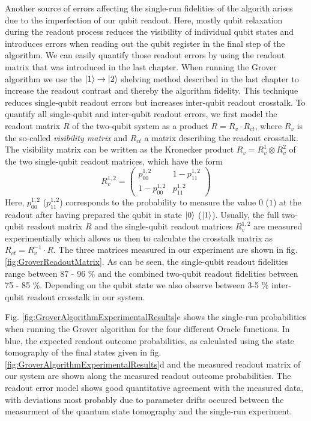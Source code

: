 Another source of errors affecting the single-run fidelities of the algorith arises due to the imperfection of our qubit readout. Here, mostly qubit relaxation during the readout process reduces the visibility of individual qubit states and introduces errors when reading out the qubit register in the final step of the algorithm. We can easily quantify those readout errors by using the readout matrix that was introduced in the last chapter. When running the Grover algorithm we use the $\left| 1 \right>\to\left| 2 \right>$ shelving method described in the last chapter to increase the readout contrast and thereby the algorithm fidelity. This technique reduces single-qubit readout errors but increases inter-qubit readout crosstalk. To quantify all single-qubit and inter-qubit readout errors, we first model the readout matrix $R$ of the two-qubit system as a product $R=R_{v}\cdot R_{ct}$, where $R_{v}$ is the so-called {\it visibility matrix} and $R_{ct}$ a matrix describing the readout crosstalk. The visibility matrix can be written as the Kronecker product $R_{v} = R_{v}^1 \otimes R_{v}^2$ of the two single-qubit readout matrices, which have the form
%
\begin{equation}
R_{v}^{1,2} = \left(
			\begin{array}{cc}
				p_{00}^{1,2} & 1-p_{11}^{1,2} \\
				1-p_{00}^{1,2} & p_{11}^{1,2}
			\end{array}
		\right)
\end{equation}
%
Here, $p_{00}^{1,2}$ ($p_{11}^{1,2}$) corresponds to the probability to measure the value $0$ ($1$) at the readout after having prepared the qubit in state $\left| 0 \right>$ ($\left| 1 \right>$). Usually, the full two-qubit readout matrix $R$ and the single-qubit readout matrices $R_{v}^{1,2}$ are measured experimentially which allows us then to calculate the crosstalk matrix as $R_{ct} = R_{v}^{-1}\cdot R$. The three matrices measured in our experiment are shown in fig. \ref{fig:GroverReadoutMatrix}. As can be seen, the single-qubit readout fidelities range between 87 - 96 \% and the combined two-qubit readout fidelities between 75 - 85 \%. Depending on the qubit state we also observe between 3-5 \% inter-qubit readout crosstalk in our system.

\smallskip

Fig. \ref{fig:GroverAlgorithmExperimentalResults}e shows the single-run probabilities when running the Grover algorithm for the four different Oracle functions. In blue, the expected readout outcome probabilities, as calculated using the state tomography of the final states given in fig. \ref{fig:GroverAlgorithmExperimentalResults}d and the measured readout matrix of our system are shown along the measured readout outcome probabilities. The readout error model shows good quantitative agreement with the measured data, with deviations most probably due to parameter drifts occured between the measurment of the quantum state tomography and the single-run experiment.

